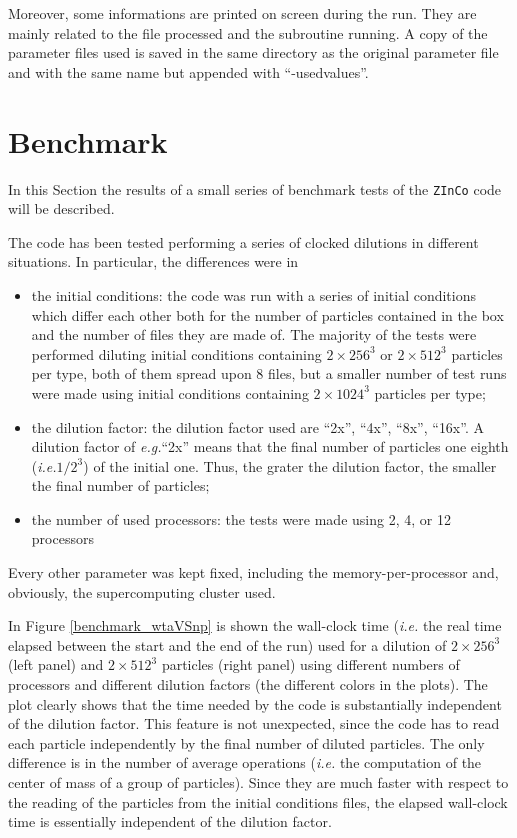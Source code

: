 \documentclass[11pt,a4paper,titlepage]{article}
\newcommand{\virg}[1]{``{#1}''}
\newcommand{\ie}{\emph{i.e.}\xspace}
\newcommand{\eg}{\emph{e.g.}\xspace}
\newcommand{\zinco}{\texttt{ZInCo}\xspace}
\begin{document}
Moreover, some informations are printed on screen during the run. They are mainly related to the file processed and the subroutine running. A copy of the parameter files used is saved in the same directory as the original parameter file and with the same name but appended with \virg{-usedvalues}.

\section{Benchmark}
In this Section the results of a small series of benchmark tests of the \zinco code will be described.

The code has been tested performing a series of clocked dilutions in different situations. In particular, the differences were in
\begin{itemize}
\item the initial conditions: the code was run with a series of initial conditions which differ each other both for the number of particles contained in the box and the number of files they are made of. The majority of the tests were performed diluting initial conditions containing $2 \times 256^3$ or $2 \times 512^3$ particles per type, both of them spread upon 8 files, but a smaller number of test runs were made using initial conditions containing $2 \times 1024^3$ particles per type;
\item the dilution factor: the dilution factor used are \virg{2x}, \virg{4x}, \virg{8x}, \virg{16x}. A dilution factor of \eg \virg{2x} means that the final number of particles one eighth (\ie $1/2^3$) of the initial one. Thus, the grater the dilution factor, the smaller the final number of particles;
\item the number of used processors: the tests were made using 2, 4, or 12 processors
\end{itemize}
Every other parameter was kept fixed, including the memory-per-processor and, obviously, the supercomputing cluster used.

In Figure \ref{benchmark_wtaVSnp} is shown the wall-clock time (\ie the real time elapsed between the start and the end of the run) used for a dilution of $2 \times 256^3$ (left panel) and $2 \times 512^3$ particles (right panel) using different numbers of processors and different dilution factors (the different colors in the plots). The plot clearly shows that the time needed by the code is substantially independent of the dilution factor. This feature is not unexpected, since the code has to read each particle independently by the final number of diluted particles. The only difference is in the number of average operations (\ie the computation of the center of mass of a group of particles). Since they are much faster with respect to the reading of the particles from the initial conditions files, the elapsed wall-clock time is essentially independent of the dilution factor.
\end{document}
